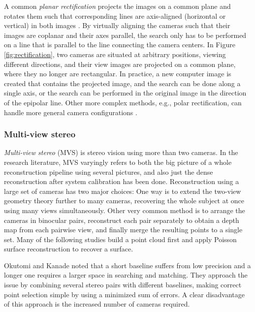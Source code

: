 A common \emph{planar rectification} projects the images on a common plane and rotates them such that corresponding lines are axis-aligned (horizontal or vertical) in both images \cite{hartley03multiview}.
By virtually aligning the cameras such that their images are coplanar and their axes parallel, the search only has to be performed on a line that is parallel to the line connecting the camera centers.
In Figure \ref{fig:rectification}, two cameras are situated at arbitrary positions, viewing different directions, and their view images are projected on a common plane, where they no longer are rectangular.
In practice, a new computer image is created that contains the projected image, and the search can be done along a single axis, or the search can be performed in the original image in the direction of the epipolar line.
Other more complex methods, e.g., polar rectification, can handle more general camera configurations \cite{pollefeys2004visual}.



\subsubsection{Multi-view stereo} %

\emph{Multi-view stereo} (MVS) is stereo vision using more than two cameras.
In the research literature, MVS varyingly refers to both the big picture of a whole reconstruction pipeline using several pictures, and also just the dense reconstruction after system calibration has been done.
Reconstruction using a large set of cameras has two major choices:
One way is to extend the two-view geometry theory further to many cameras, recovering the whole subject at once using many views simultaneously.
Other very common method is to arrange the cameras in binocular pairs, reconstruct each pair separately to obtain a depth map from each pairwise view, and finally merge the resulting points to a single set.
Many of the following studies build a point cloud first and apply Poisson surface reconstruction \cite{kazhdan2006poisson} to recover a surface.

Okutomi and Kanade \cite{okutomi1993multiple} noted that a short baseline suffers from low precision and a longer one requires a larger space in searching and matching.
They approach the issue by combining several stereo pairs with different baselines, making correct point selection simple by using a minimized sum of errors.
A clear disadvantage of this approach is the increased number of cameras required.

